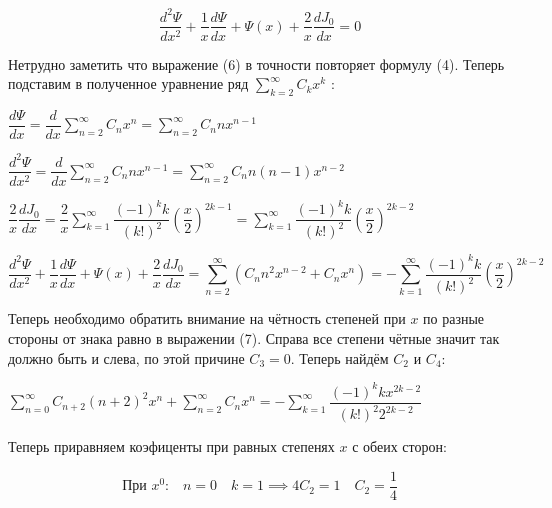 \documentclass[a4paper, 12pt]{article}
\begin{document}
	\begin{equation}
		\dfrac{d^2 \Psi}{dx^2} + \frac{1}{x} \dfrac{d\Psi }{dx} + \Psi (x)+ \dfrac{2}{x}\dfrac{dJ_0}{dx} = 0
	\end{equation}
	
	\quad Нетрудно заметить что выражение (6) в точности повторяет формулу (4). Теперь подставим в полученное уравнение ряд $\displaystyle\sum\limits_{k=2}^{\infty} C_k x^k$ : 
	
	\begin{center}
		$\dfrac{d\Psi}{dx} = \dfrac{d}{dx} \displaystyle\sum\limits_{n=2}^{\infty} C_n x^n = \displaystyle\sum\limits_{n=2}^{\infty} C_n n x^{n-1}$
	
		$\dfrac{d^2 \Psi}{dx^2} = \dfrac{d}{dx} \displaystyle\sum\limits_{n=2}^{\infty} C_n n x^{n-1} = \displaystyle\sum\limits_{n=2}^{\infty} C_n n (n-1) x^{n-2} $
		
		$\dfrac{2}{x} \dfrac{dJ_0}{dx} = \dfrac{2}{x} \displaystyle\sum\limits_{k=1}^{\infty} \dfrac{(-1)^{k} k}{(k!)^2} \left(\dfrac{x}{2}\right)^{2k-1} = \displaystyle\sum\limits_{k=1}^{\infty} \dfrac{(-1)^{k} k}{(k!)^2} \left(\dfrac{x}{2}\right)^{2k-2} $
	\end{center}
	
	\begin{equation}
		\dfrac{d^2 \Psi}{dx^2} + \frac{1}{x} \dfrac{d\Psi }{dx} + \Psi (x)+ \dfrac{2}{x}\dfrac{dJ_0}{dx} = \displaystyle\sum\limits_{n=2}^{\infty} \left(C_n n^2 x^{n-2} + C_n x^{n} \right) =- \displaystyle\sum\limits_{k=1}^{\infty} \dfrac{(-1)^{k} k}{(k!)^2} \left(\dfrac{x}{2}\right)^{2k-2} 
	\end{equation}
	
	\quad Теперь необходимо обратить внимание на чётность степеней при $x$ по разные стороны от знака равно в выражении (7). Справа все степени чётные значит так должно быть и слева, по этой причине $C_3 = 0$. Теперь найдём $C_2$ и $C_4$:
	
	\begin{center}
		$ \displaystyle\sum\limits_{n=0}^{\infty} C_{n+2} (n+2)^2 x^n + \displaystyle\sum\limits_{n=2}^{\infty} C_n x^n = - \displaystyle\sum\limits_{k=1}^{\infty} \dfrac{(-1)^k k x^{2k-2}}{(k!)^2 2^{2k-2}} $
	\end{center}
	
	\quad Теперь приравняем коэфиценты при равных степенях $x$ с обеих сторон:
	
	\begin{equation}
		\text{При } x^0 \text{:} \quad  n = 0 \quad k = 1 \implies 4C_2 = 1 \quad C_2 = \dfrac{1}{4}
	\end{equation}
	
\end{document}
